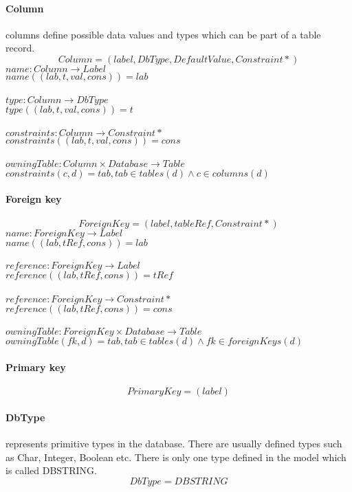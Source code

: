 \documentclass[11pt]{article}
\begin{document}
\paragraph{Column} columns define possible data values and types which can be part of a table record.
$$
Column = (label, DbType, DefaultValue, Constraint*)
$$
$name : Column \rightarrow Label $ \\
$name((lab, t, val, cons)) = lab $ \\ \\
$type : Column \rightarrow DbType $ \\
$type((lab, t, val, cons)) = t $ \\ \\
$constraints : Column \rightarrow Constraint* $ \\
$constraints((lab, t, val, cons)) = cons $ \\ \\
$owningTable : Column \times Database \rightarrow Table $ \\
$constraints(c, d) = tab, tab \in tables(d) \wedge c \in columns(d) $

\paragraph{Foreign key}
$$
ForeignKey = (label, tableRef, Constraint*)
$$
$name : ForeignKey \rightarrow Label $ \\
$name((lab, tRef, cons)) = lab $ \\ \\
$reference : ForeignKey \rightarrow Label $ \\
$reference((lab, tRef, cons)) = tRef $ \\ \\
$reference : ForeignKey \rightarrow Constraint* $ \\
$reference((lab, tRef, cons)) = cons $ \\ \\
$owningTable : ForeignKey \times Database \rightarrow Table $ \\
$owningTable(fk, d) = tab, tab \in tables(d) \wedge fk \in foreignKeys(d) $

\paragraph{Primary key}
$$
PrimaryKey =  (label) 	
$$

\paragraph{DbType} represents primitive types in the database. There are usually defined types such as Char, Integer, Boolean etc. There is only one type defined in the model which is called DBSTRING.
$$
DbType = DBSTRING
$$
\end{document}
